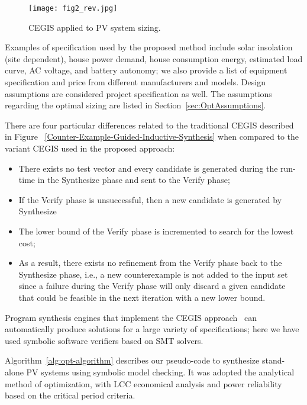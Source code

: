 \begin{figure}[h]
	\centering
	\texttt{[image: fig2\_rev.jpg]}
	\caption{CEGIS applied to PV system sizing.}
	\label{CEGISalt}
\end{figure}

Examples of specification used by the proposed method include solar insolation (site dependent), house power demand, house consumption energy, estimated load curve, AC voltage, and battery autonomy; we also provide a list of equipment specification and price from different manufacturers and models. Design assumptions are considered project specification as well. The assumptions regarding the optimal sizing are listed in Section~\ref{sec:OptAssumptions}.

There are four particular differences related to the traditional CEGIS described in Figure ~\ref{Counter-Example-Guided-Inductive-Synthesis} when compared to the variant CEGIS used in the proposed approach: 

\begin{itemize}
\item There exists no test vector and every candidate is generated during the run-time in the {\sc Synthesize} phase and sent to the {\sc Verify} phase; 
\item If the {\sc Verify} phase is unsuccessful, then a new candidate is generated by {\sc Synthesize} 
\item The lower bound of the {\sc Verify} phase is incremented to search for the lowest cost; 
\item As a result, there exists no refinement from the {\sc Verify} phase back to the {\sc Synthesize} phase, i.e., a new counterexample is not added to the {\sc input} set since a failure during the {\sc Verify} phase will only discard a given candidate that could be feasible in the next iteration with a new lower bound.
\end{itemize}

Program synthesis engines that implement the CEGIS approach~\cite{sketch} can automatically produce solutions for a large variety of specifications; here we have used symbolic software verifiers based on SMT solvers.

Algorithm~\ref{alg:opt-algorithm} describes our pseudo-code to synthesize stand-alone PV systems using symbolic model checking. It was adopted the analytical method of optimization, with LCC economical analysis and power reliability based on the critical period criteria.

